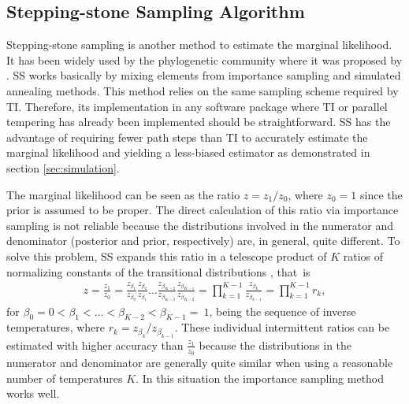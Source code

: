 \documentclass[aps,reprint,amsmath,amssymb,showpacs,showkeys]{revtex4-1}%
\begin{document}
\subsection{Stepping-stone Sampling Algorithm}
Stepping-stone sampling is another method to estimate the marginal likelihood.  It has been widely used by the phylogenetic community where it was proposed by \cite{Xie:Lewis:Fan:Kuo:Chen:2011}.  SS works basically by mixing elements from importance sampling and simulated annealing methods.  This method relies on the same sampling scheme required by TI.  Therefore, its implementation in any software package where TI or parallel tempering has already been implemented should be straightforward.  SS has the advantage of requiring fewer path steps than TI to accurately estimate  the marginal likelihood and yielding a less-biased estimator as demonstrated in section \ref{sec:simulation}.

The marginal likelihood can be seen as the ratio $z = z_1/z_0$, where $z_0 = 1$ since the prior is assumed to be proper.  The direct calculation of this ratio via importance sampling is not reliable because the distributions involved in the numerator and denominator (posterior and prior, respectively) are, in general, quite different.  To solve this problem, SS expands this ratio in a telescope product of $K$ ratios of normalizing constants of the transitional distributions \cite{Neal:1993}, that~is
\begin{align*}
\label{eq:SS_ratios}
z = \frac{z_{1}}{z_{0}} = \frac{z_{\beta_{1}}}{z_{\beta_{0}}}\frac{z_{\beta_{2}}}{z_{\beta_{1}}} \dots
\frac{z_{\beta_{K-2}}}{z_{\beta_{K-3}}} \frac{z_{\beta_{K-1}}}{z_{\beta_{K-2}}} = \prod_{k=1}^{K-1} \frac{z_{\beta_{k}}}{z_{\beta_{k-1}}} = \prod_{k=1}^{K-1} r_k,
\end{align*}
for $\beta_0 = 0 < \beta_1 < \dots < \beta_{K-2}<\beta_{K-1} =~1$, being the sequence of inverse temperatures, where $r_k=z_{\beta_k}/z_{\beta_{k-1}}$.  These individual intermittent ratios can be estimated  with higher accuracy than
$\frac{z_1}{z_0}$ because the  distributions in the
numerator and denominator are generally quite similar when using a reasonable number of temperatures $K$.  In this situation the importance sampling method works well. 
\end{document}
